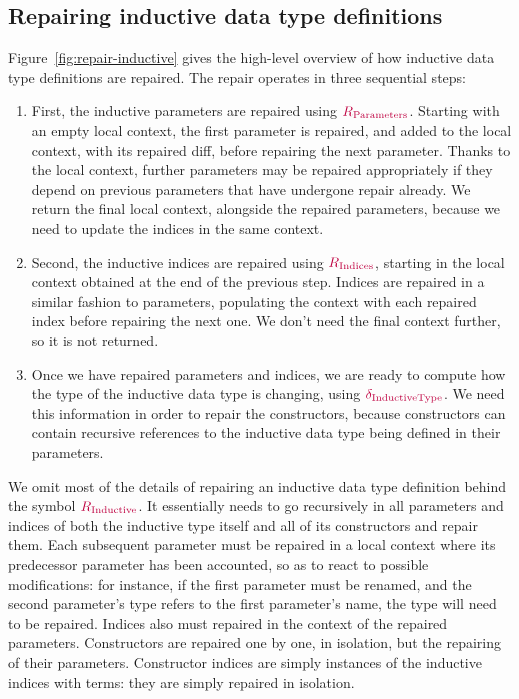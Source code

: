 \subsection{Repairing inductive data type definitions}

Figure~\ref{fig:repair-inductive} gives the high-level overview of how inductive
data type definitions are repaired.  The repair operates in three sequential
steps:

\begin{enumerate}

  \item First, the inductive parameters are repaired using
$\textcolor{purple}{R_{\text{Parameters}}}{}$.  Starting with an empty local context, the first
parameter is repaired, and added to the local context, with its repaired diff,
before repairing the next parameter.  Thanks to the local context, further
parameters may be repaired appropriately if they depend on previous parameters
that have undergone repair already.  We return the final local context,
alongside the repaired parameters, because we need to update the indices in the
same context.

  \item Second, the inductive indices are repaired using $\textcolor{purple}{R_{\text{Indices}}}{}$,
starting in the local context obtained at the end of the previous step.  Indices
are repaired in a similar fashion to parameters, populating the context with
each repaired index before repairing the next one.  We don't need the final
context further, so it is not returned.

  \item Once we have repaired parameters and indices, we are ready to compute
how the type of the inductive data type is changing, using $\textcolor{purple}{\delta_{\text{InductiveType}}}{}$.
We need this information in order to repair the constructors, because
constructors can contain recursive references to the inductive data type being
defined in their parameters.

\end{enumerate}

We omit most of the details of repairing an inductive data type definition
behind the symbol $\textcolor{purple}{R_{\text{Inductive}}}$.  It essentially needs to go recursively in all
parameters and indices of both the inductive type itself and all of its
constructors and repair them.  Each subsequent parameter must be repaired in a
local context where its predecessor parameter has been accounted, so as to react
to possible modifications: for instance, if the first parameter must be renamed,
and the second parameter's type refers to the first parameter's name, the type
will need to be repaired.  Indices also must repaired in the context of the
repaired parameters.  Constructors are repaired one by one, in isolation, but
the repairing of their parameters.  Constructor indices are simply instances of
the inductive indices with terms: they are simply repaired in isolation.

